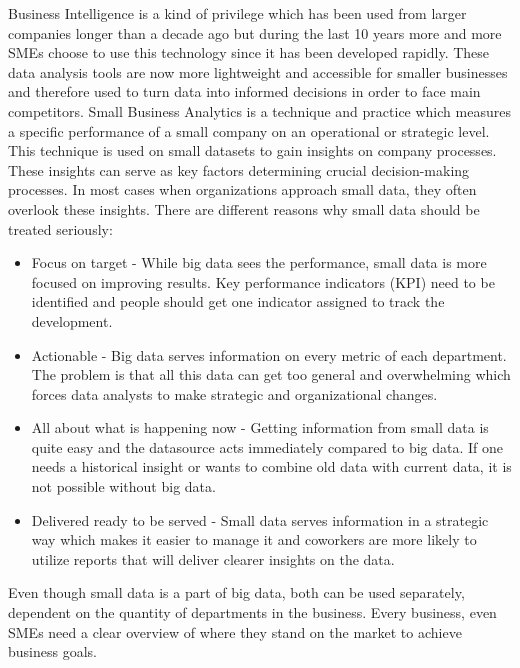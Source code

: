 \documentclass[../paper.tex]{subfiles}
\begin{document}
Business Intelligence is a kind of privilege which has been used from larger companies longer than a decade ago but during the last 10 years more and more SMEs choose to use this technology since it has been developed rapidly. These data analysis tools are now more lightweight and accessible for smaller businesses and therefore used to turn data into informed decisions in order to face main competitors. Small Business Analytics  is a technique and practice which measures a specific performance of a small company on an operational or strategic level. This technique is used on small datasets to gain insights on company processes. These insights can serve as key factors determining crucial decision-making processes. In most cases when organizations approach small data, they often overlook these insights. There are different reasons why small data should be treated seriously:
\begin{itemize}
	\item Focus on target - While big data sees the performance, small data is more focused on improving results. Key performance indicators (KPI) need to be identified and people should get one indicator assigned to track the development.
	\item Actionable - Big data serves information on every metric of each department. The problem is that all this data can get too general and overwhelming which forces data analysts to make strategic and organizational changes.
	\item All about what is happening now - Getting information from small data is quite easy and the datasource acts immediately compared to big data. If one needs a historical insight or wants to combine old data with current data, it is not possible without big data.
	\item Delivered ready to be served - Small data serves information in a strategic way which makes it easier to manage it and coworkers are more likely to utilize reports that will deliver clearer insights on the data.
\end{itemize}
Even though small data is a part of big data, both can be used separately, dependent on the quantity of departments in the business. Every business, even SMEs need a clear overview of where they stand on the market to achieve business goals.~\cite{Durcevic2018}
\end{document}
